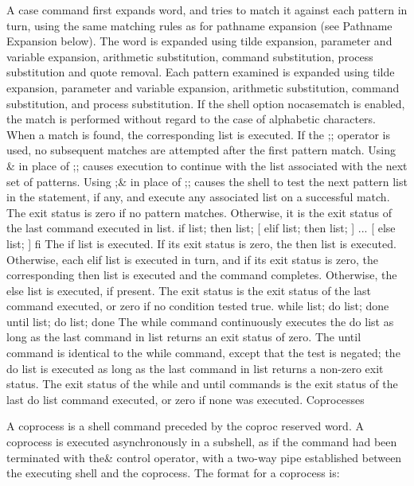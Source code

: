 \documentclass[11pt]{article}
\begin{document}
A case command first expands word, and tries to match it against each pattern in turn, using the same matching rules as for pathname expansion (see Pathname Expansion below). The word is expanded using tilde expansion, parameter and variable expansion, arithmetic substitution, command substitution, process substitution and quote removal. Each pattern examined is expanded using tilde expansion, parameter and variable expansion, arithmetic substitution, command substitution, and process substitution. If the shell option nocasematch is enabled, the match is performed without regard to the case of alphabetic characters. When a match is found, the corresponding list is executed. If the ;; operator is used, no subsequent matches are attempted after the first pattern match. Using \& in place of ;; causes execution to continue with the list associated with the next set of patterns. Using ;\& in place of ;; causes the shell to test the next pattern list in the statement, if any, and execute any associated list on a successful match. The exit status is zero if no pattern matches. Otherwise, it is the exit status of the last command executed in list.
if list; then list; [ elif list; then list; ] ... [ else list; ] fi
The if list is executed. If its exit status is zero, the then list is executed. Otherwise, each elif list is executed in turn, and if its exit status is zero, the corresponding then list is executed and the command completes. Otherwise, the else list is executed, if present. The exit status is the exit status of the last command executed, or zero if no condition tested true.
while list; do list; done
until list; do list; done
The while command continuously executes the do list as long as the last command in list returns an exit status of zero. The until command is identical to the while command, except that the test is negated; the do list is executed as long as the last command in list returns a non-zero exit status. The exit status of the while and until commands is the exit status of the last do list command executed, or zero if none was executed.
Coprocesses

A coprocess is a shell command preceded by the coproc reserved word. A coprocess is executed asynchronously in a subshell, as if the command had been terminated with the\& control operator, with a two-way pipe established between the executing shell and the coprocess.
The format for a coprocess is:
\end{document}
